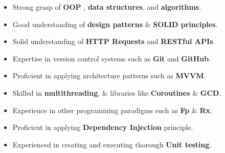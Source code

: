 \documentclass[10pt,a4paper,ragged2e,withhyper]{altacv}
\begin{document}
    \begin{paracol}{2}









        \newpage


        \switchcolumn

        {\large\begin{itemize}
                   \item Strong grasp of \textbf{OOP} , \textbf{data structures}, and \textbf{algorithms}.
                   \item Good understanding of \textbf{design patterns} \& \textbf{SOLID principles}.
                   \item Solid understanding of \textbf{HTTP Requests} and \textbf{RESTful APIs}.
                   \item Expertise in version control systems such as \textbf{Git} and \textbf{GitHub}.
                   \item Proficient in applying architecture patterns such as \textbf{MVVM}.
                   \item Skilled in \textbf{multithreading}, \& libraries like \textbf{Coroutines} \& \textbf{GCD}.
                   \item Experience in other programming paradigms such as \textbf{Fp} \& \textbf{Rx}.
                   \item Proficient in applying \textbf{Dependency Injection} principle.
                   \item Experienced in creating and executing thorough \textbf{Unit testing}.
        \end{itemize}}


\end{paracol}
\end{document}

